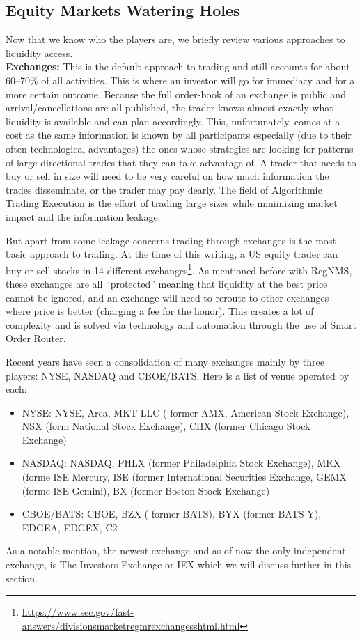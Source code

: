 \subsection{Equity Markets Watering Holes}


Now that we know who the players are, we briefly review various approaches to liquidity access. \\


\noindent\textbf{Exchanges:} This is the default approach to trading and still accounts for about 60--70\% of all activities. This is where an investor will go for immediacy and for a more certain outcome. Because the full order-book of an exchange is public and arrival/cancellations are all published, the trader knows almost exactly what liquidity is available and can plan accordingly. This, unfortunately, comes at a cost as the same information is known by all participants especially (due to their often technological advantages) the ones whose strategies are looking for patterns of large directional trades that they can take advantage of. A trader that needs to buy or sell in size will need to be very careful on how much information the trades disseminate, or the trader may pay dearly. The field of Algorithmic Trading Execution is the effort of trading large sizes while minimizing market impact and the information leakage. 


But apart from some leakage concerns trading through exchanges is the most basic approach to trading. At the time of this writing, a US equity trader can buy or sell stocks in 14 different exchanges\footnote{\url{https://www.sec.gov/fast-answers/divisionsmarketregmrexchangesshtml.html}}. As mentioned before with RegNMS, these exchanges are all ``protected'' meaning that liquidity at the best price cannot be ignored, and an exchange will need to reroute to other exchanges where price is better (charging a fee for the honor). This creates a lot of complexity and is solved via technology and automation through the use of Smart Order Router.


Recent years have seen a consolidation of many exchanges mainly by three players: NYSE, NASDAQ and CBOE/BATS. Here is a list of venue operated by each:
        \begin{itemize}
        \item NYSE: NYSE, Arca, MKT LLC ( former AMX, American Stock Exchange), NSX (form National Stock Exchange), CHX (former Chicago Stock Exchange)
        \item NASDAQ:  NASDAQ, PHLX (former Philadelphia Stock Exchange), MRX (forme ISE Mercury, ISE (former International Securities Exchange, GEMX (forme ISE Gemini), BX (former Boston Stock Exchange)
        \item CBOE/BATS: CBOE, BZX ( former BATS), BYX (former BATS-Y), EDGEA, EDGEX, C2
        \end{itemize}
As a notable mention, the newest exchange and as of now the only independent exchange, is The Investors Exchange or IEX which we will discuss further in this section.


